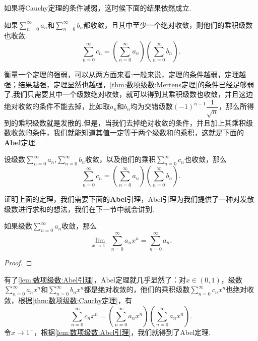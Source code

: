     如果将Cauchy定理的条件减弱，这时候下面的结果依然成立.
    \begin{theorem}[Mertens]\label{thm:数项级数:Mertens定理}
        如果\(\sum\limits_{n=0}^{\infty}a_n\)和\(\sum\limits_{n=0}^{\infty}b_n\)都收敛，且其中至少一个绝对收敛，则他们的乘积级数也收敛.\[\sum_{n=0}^{\infty}c_n=\left(\sum_{n=0}^{\infty}a_n\right)\left(\sum_{n=0}^{\infty}b_n\right).\]
    \end{theorem}

    衡量一个定理的强弱，可以从两方面来看:一般来说，定理的条件越弱，定理越强；结果越强，定理显然也越强，\enspace \autoref{thm:数项级数:Mertens定理}的条件已经足够弱了,我们只需要其中一个级数绝对收敛，就可以得到其乘积级数也收敛，并且这边绝对收敛的条件不能去掉，比如取\(a_n\)和\(b_n\)均为交错级数\((-1)^{n-1}\dfrac{1}{\sqrt{n}}\)，那么所得到的乘积级数就是发散的.但是，当我们去掉绝对收敛的条件，并且加上其乘积级数收敛的条件，我们就能知道其值一定等于两个级数和的乘积，这就是下面的{\heiti \textbf{Abel}定理}.

    \begin{theorem}[Abel定理]
        设级数\(\sum\limits_{n=0}^{\infty}a_n\),\enspace \(\sum\limits_{n=0}^{\infty}b_n\)收敛，以及他们的乘积\(\sum\limits_{n=0}^{\infty}c_n\)也收敛，那么\[\sum_{n=0}^{\infty}c_n = \left(\sum_{n = 0}^{\infty}a_n\right)\left(\sum_{n = 0}^{\infty}b_n\right).\]
    \end{theorem}

    证明上面的定理，我们需要下面的\textbf{Abel}{\heiti 引理}，Abel引理为我们提供了一种对发散级数进行求和的想法，我们在下一节中就会讲到.

    \begin{lemma}[Abel引理]\label{lem:数项级数:Abel引理}
        如果级数\(\sum\limits_{n=0}^{\infty}a_n\)收敛，那么\[\lim_{x\to 1^-}\sum_{n=0}^{\infty}a_nx^n = \sum_{n=0}^{\infty}a_n.\]
    \end{lemma}
    \begin{proof}
        
    \end{proof}

    有了\autoref{lem:数项级数:Abel引理}，\enspace Abel定理就几乎显然了：对\(x\in(0,1)\)，级数\(\sum\limits_{n=0}^{\infty}a_nx^n\)和\(\sum\limits_{n=0}^{\infty}b_nx^n\)都是绝对收敛的，他们的乘积级数\(\sum\limits_{n=0}^{\infty}c_nx^n\)也绝对收敛，根据\autoref{thm:数项级数:Cauchy定理}，有\[\sum_{n=0}^{\infty}c_nx^n=\left(\sum_{n=0}^{\infty}a_nx^n\right)\left(\sum_{n=0}^{\infty}a_nx^n\right).\]
    令\(x\to1^-\)，根据\autoref{lem:数项级数:Abel引理}，我们就得到了Abel定理.

